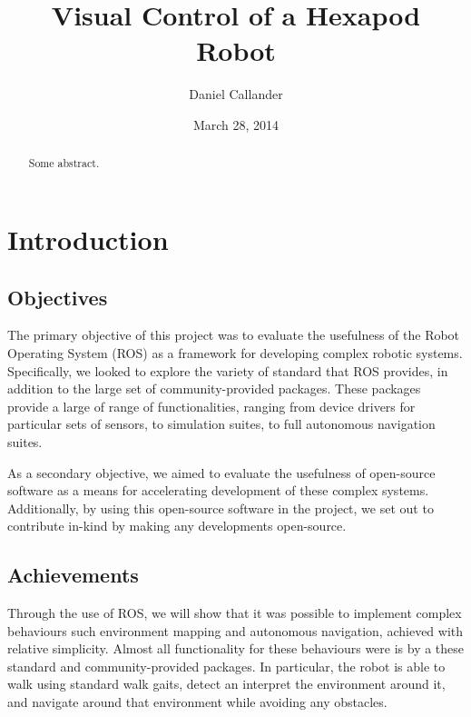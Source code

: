 \documentclass{l4proj}
\begin{document}


\title{Visual Control of a Hexapod Robot}
\author{Daniel Callander}
\date{March 28, 2014}
\maketitle

\begin{abstract}
Some abstract.
\end{abstract}

\educationalconsent
\tableofcontents


\chapter{Introduction}

\section{Objectives}
The primary objective of this project was to evaluate the usefulness of the Robot Operating System (ROS) \cite{ros_site} as a framework for developing complex robotic systems. Specifically, we looked to explore the variety of standard that ROS provides, in addition to the large set of community-provided packages. These packages provide a large of range of functionalities, ranging from device drivers for particular sets of sensors, to simulation suites, to full autonomous navigation suites.

As a secondary objective, we aimed to evaluate the usefulness of open-source software as a means for accelerating development of these complex systems. Additionally, by using this open-source software in the project, we set out to contribute in-kind by making any developments open-source.

\section{Achievements}
Through the use of ROS, we will show that it was possible to implement complex behaviours such environment mapping and autonomous navigation, achieved with relative simplicity. Almost all functionality for these behaviours were is by a these standard and community-provided packages. In particular, the robot is able to walk using standard walk gaits, detect an interpret the environment around it, and navigate around that environment while avoiding any obstacles.
\end{document}
